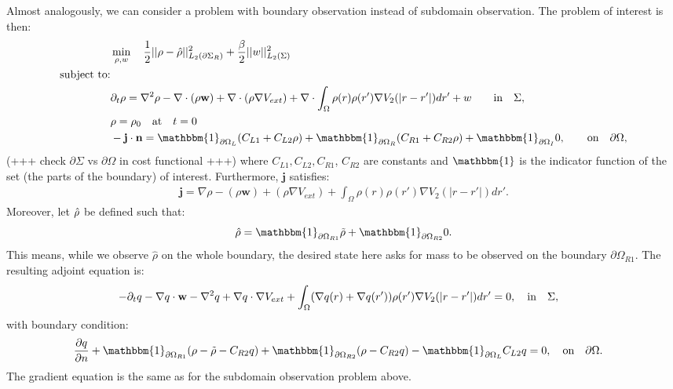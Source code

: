 
Almost analogously, we can consider a problem with boundary observation instead of subdomain observation.
The problem of interest is then:
\begin{align*}
&\min_{\Sta, w} \quad \frac{1}{2}|| \Sta -\hat \Sta||^2_{L_2(\partial \Sigma_R)} + \frac{\beta}{2}||w||^2_{L_2(\Sigma)}\\
\text{subject to:}\\
&\partial_t \rho = \nabla^2 \rho - \nabla \cdot (\rho \mathbf{w}) +\nabla \cdot (\rho \nabla V_{ext}) + \nabla \cdot \int_\Omega \rho(r) \rho(r') \nabla V_2(|r-r'|) dr' + w \quad  \quad\text{in} \quad \Sigma,\notag\\
& \rho = \rho_0 \quad \text{at} \quad t=0 \notag\\
& - \mathbf{j} \cdot \nor = \mathbbm{1}_{\partial \Omega_L}( C_{L1}  + C_{L2}\Sta) +\mathbbm{1}_{\partial \Omega_R} ( C_{R1}  + C_{R2}\Sta) +\mathbbm{1}_{\partial \Omega_I} 0, \quad  \quad\text{on} \quad \partial \Omega, 
\end{align*}
(+++ check $\partial \Sigma$ vs $\partial \Omega$ in cost functional +++)
where $C_{L1}, C_{L2}, C_{R1}$, $C_{R2}$ are constants and $\mathbbm{1}$ is the indicator function of the set (the parts of the boundary) of interest.
Furthermore, $\mathbf{j}$ satisfies:
\begin{align*}
\mathbf{j}=\nabla \rho - (\rho \mathbf{w}) +(\rho \nabla V_{ext}) +  \int_\Omega \rho(r) \rho(r') \nabla V_2(|r-r'|) dr'.
\end{align*}
Moreover, let $\hat {\rho}$ be defined such that:
\begin{align*}
\hat \Sta = \mathbbm{1}_{\partial \Omega_{R1}} \tilde \Sta  +\mathbbm{1}_{\partial \Omega_{R2}} 0.
\end{align*}
This means, while we observe $\hat \rho$ on the whole boundary, the desired state here asks for mass to be observed on the boundary $\partial \Omega_{R1}$.
The resulting adjoint equation is:
\begin{align*}
- \partial_t  q  - \nabla q \cdot \mathbf{w} - \nabla^2 q \notag 
+  \nabla q \cdot \nabla V_{ext}  \notag 
+ \int_\Omega (\nabla  q(r)+\nabla  q(r')) \rho(r') \nabla V_2(|r-r'|) dr' &=0, \quad \text{in} \quad \Sigma, 
\end{align*}
with boundary condition:
\begin{align*}
\frac{\partial \Adjb }{\partial n}+ \mathbbm{1}_{\partial \Omega_{R1}}(\rho- \tilde{\rho} -C_{R2} \Adjb) + \mathbbm{1}_{\partial \Omega_{R2}} (\Sta-C_{R2} \Adjb) - \mathbbm{1}_{\partial \Omega_L} C_{L2} \Adjb   &=0, \quad \text{on} \quad \partial \Omega.
\end{align*}
The gradient equation is the same as for the subdomain observation problem above.

